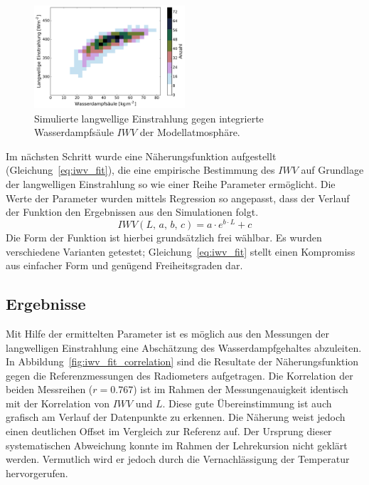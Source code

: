 \documentclass[10pt,a4paper,compsoc,peer review papers]{IEEEtran}
\begin{document}
\begin{figure}[ht]
  \centering
  \includegraphics[width=0.5\textwidth]{figures/iwv_lwr_correlation.pdf}
  \caption{Simulierte langwellige Einstrahlung gegen integrierte Wasserdampfsäule
  $IWV$ der Modellatmosphäre.}
  \label{fig:iwv_lwr_correlation}
\end{figure}

Im nächsten Schritt wurde eine Näherungsfunktion aufgestellt
(Gleichung~\ref{eq:iwv_fit}), die eine empirische Bestimmung des $IWV$ auf
Grundlage der langwelligen Einstrahlung so wie einer Reihe Parameter
ermöglicht. Die Werte der Parameter wurden mittels Regression so angepasst,
dass der Verlauf der Funktion den Ergebnissen aus den Simulationen folgt.
\begin{equation}\label{eq:iwv_fit}
  IWV(L,\,a,\,b,\,c) = a \cdot e^{b \cdot L} + c
\end{equation}
Die Form der Funktion ist hierbei grundsätzlich frei wählbar. Es wurden
verschiedene Varianten getestet; Gleichung~\ref{eq:iwv_fit} stellt einen
Kompromiss aus einfacher Form und genügend Freiheitsgraden dar.

\subsection{Ergebnisse}\label{subsec:iwv_ergebnisse}
Mit Hilfe der ermittelten Parameter ist es möglich aus den Messungen der
langwelligen Einstrahlung eine Abschätzung des Wasserdampfgehaltes abzuleiten.
In Abbildung~\ref{fig:iwv_fit_correlation} sind die Resultate der
Näherungsfunktion gegen die Referenzmessungen des Radiometers aufgetragen. Die
Korrelation der beiden Messreihen ($r=0.767$) ist im Rahmen der
Messungenauigkeit identisch mit der Korrelation von $IWV$ und $L$. Diese gute
Übereinstimmung ist auch grafisch am Verlauf der Datenpunkte zu erkennen.
Die Näherung weist jedoch einen deutlichen Offset im Vergleich zur Referenz
auf.  Der Ursprung dieser systematischen Abweichung konnte im Rahmen der
Lehrekursion nicht geklärt werden. Vermutlich wird er jedoch durch die
Vernachlässigung der Temperatur hervorgerufen.
\end{document}

